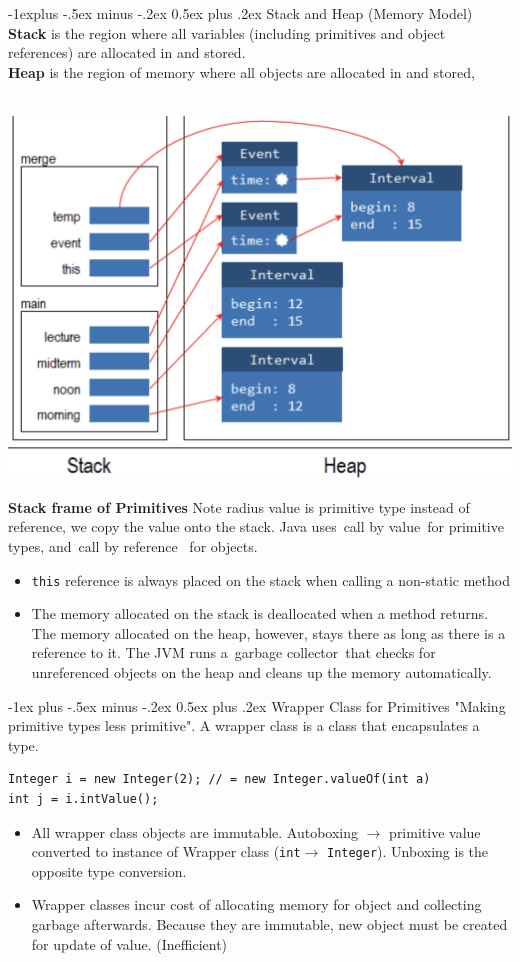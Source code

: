 \documentclass[12pt, landscape]{article}
\makeatletter
\newcommand{\code}[1]{\colorbox{gray!25!}{\lstinline|#1|}}
\renewcommand{\section}{\@startsection{section}{1}{0mm}%
                                {-1ex plus -.5ex minus -.2ex}%
                                {0.5ex plus .2ex}%
                                {\normalfont\large\bfseries}}
\renewcommand{\subsection}{\@startsection{subsection}{2}{0.1mm}%
                                {-1explus -.5ex minus -.2ex}%
                                {0.5ex plus .2ex}%
                                {\normalfont\normalsize\bfseries}}
\makeatother
\begin{document}
\begin{multicols*}{3}
\subsection{Stack and Heap (Memory Model)}
	\textbf{Stack} is the region where all variables (including primitives and object references) are allocated in and stored. \\
	\textbf{Heap} is the region of memory where all objects are allocated in and stored, \\ ~\\
	\centerline{\includegraphics[width=0.5 \linewidth]{stackandheap}}
	\textbf{Stack frame of Primitives} Note radius value is primitive type instead of reference, we copy the value onto the stack. Java uses call by value for primitive types, and call by reference
 for objects. \\
\begin{itemize}
	\item	\code{this} reference is always placed on the stack when calling a non-static method 
	\item The memory allocated on the stack is deallocated when a method returns. The memory allocated on the heap, however, stays there as long as there is a reference to it. The JVM runs a garbage collector that checks for unreferenced objects on the heap and cleans up the memory automatically.
\end{itemize}

\section{Wrapper Class for Primitives}
"Making primitive types less primitive". A wrapper class is a class that encapsulates a type. 
\begin{lstlisting}
Integer i = new Integer(2); // = new Integer.valueOf(int a)
int j = i.intValue();
\end{lstlisting}
\begin{itemize}
	\item All wrapper class objects are immutable. Autoboxing $\rightarrow$ primitive value converted to instance of Wrapper class (\code{int}$\rightarrow$ \code{Integer}). Unboxing is the opposite type conversion.
	\item Wrapper classes incur cost of allocating memory for object and collecting garbage afterwards. Because they are immutable, new object must be created for update of value. (Inefficient)
\end{itemize}


\end{multicols*}
\end{document}
